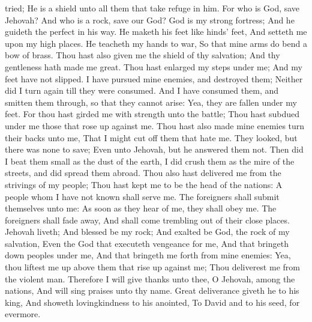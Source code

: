 tried; He is a shield unto all them that take refuge in him.  For who is God, save Jehovah? And who is a rock, save our God?  God is my strong fortress; And he guideth the perfect in his way.  He maketh his feet like hinds’ feet, And setteth me upon my high places.  He teacheth my hands to war, So that mine arms do bend a bow of brass.  Thou hast also given me the shield of thy salvation; And thy gentleness hath made me great.  Thou hast enlarged my steps under me; And my feet have not slipped.  I have pursued mine enemies, and destroyed them; Neither did I turn again till they were consumed.  And I have consumed them, and smitten them through, so that they cannot arise: Yea, they are fallen under my feet.  For thou hast girded me with strength unto the battle; Thou hast subdued under me those that rose up against me.  Thou hast also made mine enemies turn their backs unto me, That I might cut off them that hate me.  They looked, but there was none to save; Even unto Jehovah, but he answered them not.  Then did I beat them small as the dust of the earth, I did crush them as the mire of the streets, and did spread them abroad.  Thou also hast delivered me from the strivings of my people; Thou hast kept me to be the head of the nations: A people whom I have not known shall serve me.  The foreigners shall submit themselves unto me: As soon as they hear of me, they shall obey me.  The foreigners shall fade away, And shall come trembling out of their close places.  Jehovah liveth; And blessed be my rock; And exalted be God, the rock of my salvation,  Even the God that executeth vengeance for me, And that bringeth down peoples under me,  And that bringeth me forth from mine enemies: Yea, thou liftest me up above them that rise up against me; Thou deliverest me from the violent man.  Therefore I will give thanks unto thee, O Jehovah, among the nations, And will sing praises unto thy name.  Great deliverance giveth he to his king, And showeth lovingkindness to his anointed, To David and to his seed, for evermore. 

